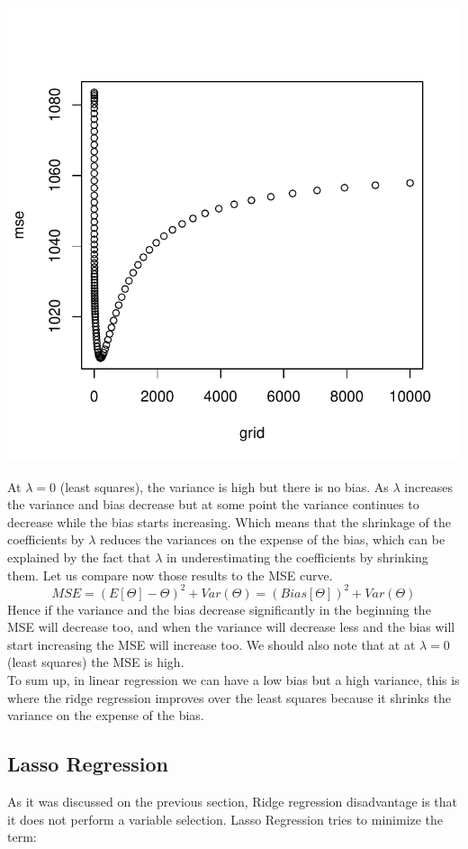 \documentclass[]{report}
\begin{document}
\begin{center}
	\includegraphics[width=0.8\linewidth]{Figures/ridge_mse.pdf}
\end{center}

At $\lambda=0$ (least squares), the variance is high but there is no bias.
As $\lambda$ increases the variance and bias decrease but at some point the variance continues to decrease while the bias starts increasing. Which means that the shrinkage of the coefficients by $\lambda$ reduces the variances on the expense of the bias, which can be explained by the fact that $\lambda$ in underestimating the coefficients by shrinking them. Let us compare now those results to the MSE curve. 
$$MSE = (E[\varTheta]-\varTheta)^{2} + Var(\varTheta) = (Bias[\varTheta])^{2} + Var(\varTheta)$$
Hence if the variance and the bias decrease significantly in the beginning the MSE will decrease too, and when the variance will decrease less and the bias will start increasing the MSE will increase too. We should also note that at at  $\lambda=0$ (least squares) the MSE is high.\\
To sum up, in linear regression we can have a low bias but a high variance, this is where the ridge regression improves over the least squares because it shrinks the variance on the expense of the bias.
  
\subsection{Lasso Regression}
As it was discussed on the previous section, Ridge regression disadvantage is that it does not perform a variable selection. Lasso Regression tries to minimize the term:
\end{document}
